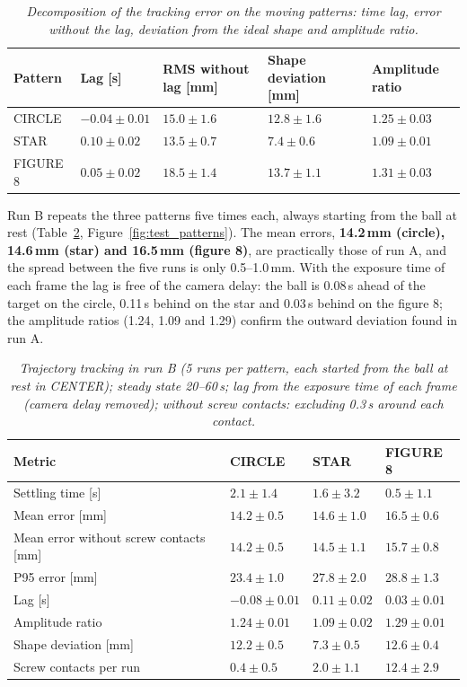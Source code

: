 \documentclass[12pt,a4paper]{report}
\begin{document}
\begin{table}[H]
\centering
\begin{tabularx}{\textwidth}{|l|X|X|X|X|}
\hline
\textbf{Pattern} & \textbf{Lag [s]} & \textbf{RMS without lag [mm]} & \textbf{Shape deviation [mm]} & \textbf{Amplitude ratio} \\ \hline
CIRCLE & $-0.04 \pm 0.01$ & $15.0 \pm 1.6$ & $12.8 \pm 1.6$ & $1.25 \pm 0.03$ \\ \hline
STAR & $0.10 \pm 0.02$ & $13.5 \pm 0.7$ & $7.4 \pm 0.6$ & $1.09 \pm 0.01$ \\ \hline
FIGURE 8 & $0.05 \pm 0.02$ & $18.5 \pm 1.4$ & $13.7 \pm 1.1$ & $1.31 \pm 0.03$ \\ \hline
\end{tabularx}
\caption{\textit{Decomposition of the tracking error on the moving patterns: time lag, error without the lag, deviation from the ideal shape and amplitude ratio.}}
\label{tab:lag}
\end{table}

Run B repeats the three patterns five times each, always starting from the ball at rest (Table~\ref{tab:test_patterns}, Figure~\ref{fig:test_patterns}). The mean errors, \textbf{14.2\,mm (circle), 14.6\,mm (star) and 16.5\,mm (figure 8)}, are practically those of run A, and the spread between the five runs is only 0.5--1.0\,mm. With the exposure time of each frame the lag is free of the camera delay: the ball is 0.08\,s ahead of the target on the circle, 0.11\,s behind on the star and 0.03\,s behind on the figure 8; the amplitude ratios (1.24, 1.09 and 1.29) confirm the outward deviation found in run A.

\begin{table}[H]
\centering
\begin{tabularx}{\textwidth}{|X|l|l|l|}
\hline
\textbf{Metric} & \textbf{CIRCLE} & \textbf{STAR} & \textbf{FIGURE 8} \\ \hline
Settling time [s] & $2.1 \pm 1.4$ & $1.6 \pm 3.2$ & $0.5 \pm 1.1$ \\ \hline
Mean error [mm] & $14.2 \pm 0.5$ & $14.6 \pm 1.0$ & $16.5 \pm 0.6$ \\ \hline
Mean error without screw contacts [mm] & $14.2 \pm 0.5$ & $14.5 \pm 1.1$ & $15.7 \pm 0.8$ \\ \hline
P95 error [mm] & $23.4 \pm 1.0$ & $27.8 \pm 2.0$ & $28.8 \pm 1.3$ \\ \hline
Lag [s] & $-0.08 \pm 0.01$ & $0.11 \pm 0.02$ & $0.03 \pm 0.01$ \\ \hline
Amplitude ratio & $1.24 \pm 0.01$ & $1.09 \pm 0.02$ & $1.29 \pm 0.01$ \\ \hline
Shape deviation [mm] & $12.2 \pm 0.5$ & $7.3 \pm 0.5$ & $12.6 \pm 0.4$ \\ \hline
Screw contacts per run & $0.4 \pm 0.5$ & $2.0 \pm 1.1$ & $12.4 \pm 2.9$ \\ \hline
\end{tabularx}
\caption{\textit{Trajectory tracking in run B (5 runs per pattern, each started from the ball at rest in CENTER); steady state 20--60\,s; lag from the exposure time of each frame (camera delay removed); without screw contacts: excluding 0.3\,s around each contact.}}
\label{tab:test_patterns}
\end{table}
\end{document}
